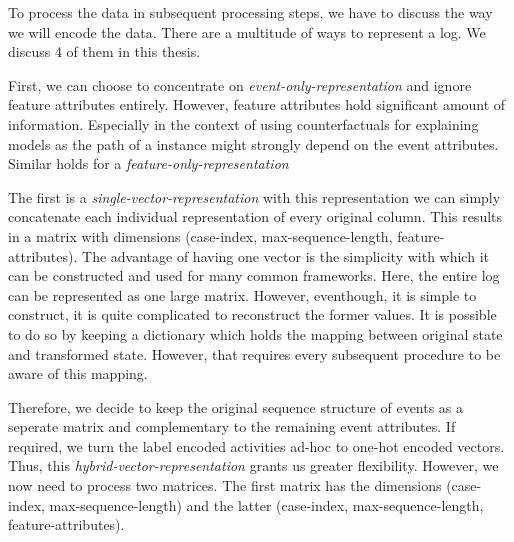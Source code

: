 \documentclass[./../../paper.tex]{subfiles}
\begin{document}
To process the data in subsequent processing steps, we have to discuss the way we will encode the data. There are a multitude of ways to represent a log. We  discuss 4 of them in this thesis.

First, we can choose to concentrate on \emph{event-only-representation} and ignore feature attributes entirely. However, feature attributes hold significant amount of information. Especially in the context of using counterfactuals for explaining models as the path of a \gls{instance} might strongly depend on the event attributes. Similar holds for a \emph{feature-only-representation}

The first is a \emph{single-vector-representation} with this representation we can simply concatenate each individual representation of every original column. This results in a matrix with dimensions (case-index, max-sequence-length, feature-attributes). The advantage of having one vector is the simplicity with which it can be constructed and used for many common frameworks. Here, the entire log can be represented as one large matrix. However, eventhough, it is simple to construct, it is quite complicated to reconstruct the former values. It is possible to do so by keeping a dictionary which holds the mapping between original state and transformed state. However, that requires every subsequent procedure to be aware of this mapping.

Therefore, we decide to keep the original sequence structure of events as a seperate matrix and complementary to the remaining event attributes. If required, we turn the label encoded activities ad-hoc to one-hot encoded vectors. Thus, this \emph{hybrid-vector-representation} grants us greater flexibility. However, we now need to process two matrices. The first matrix has the dimensions (case-index, max-sequence-length) and the latter (case-index, max-sequence-length, feature-attributes).


\end{document}
